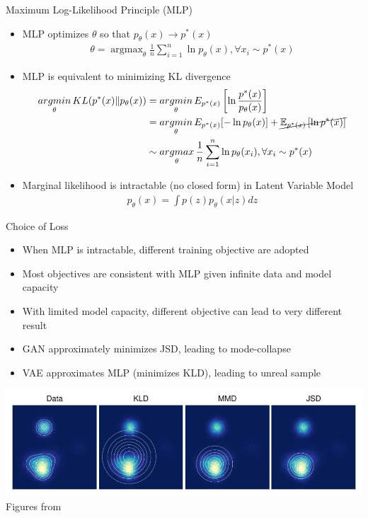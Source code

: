 \documentclass[compress]{beamer}
\newcommand{\expects}[2]{\mathbb{E}_{#1} \left[ #2 \right]}
\begin{document}
\begin{frame}{Maximum Log-Likelihood Principle (MLP)}
    \begin{itemize}
        \item MLP optimizes $\theta$ so that $p_{\theta}(x)\rightarrow p^*(x)$
            \begin{align*}
                \theta = \mathop{argmax}_{\theta} \frac{1}{n}\sum_{i=1}^n \ln p_{\theta}(x), \forall x_i \sim p^*(x)
            \end{align*}
        \item MLP is equivalent to minimizing KL divergence
            \begin{align*}
                \mathop{argmin}_{\theta} KL(p^*(x)\|p_{\theta}(x)) & = \mathop{argmin}_{\theta} E_{p^*(x)} \left[ \ln \frac{p^*(x)}{p_{\theta}(x)}  \right]
                 \\
                                                                   & = \mathop{argmin}_{\theta} E_{p^*(x)}[-\ln p_{\theta}(x)] + \cancel{\expects{p^*(x)}{\ln p^*(x)}}\\
                                                                   & \sim \mathop{argmax}_{\theta} \frac{1}{n}\sum_{i=1}^n \ln p_{\theta}(x_i), \forall x_i \sim p^*(x)
            \end{align*}
        \item Marginal likelihood is intractable (no closed form) in Latent Variable Model
            \begin{align*}
                p_{\theta}(x) = \int p(z)p_{\theta}(x|z) dz
            \end{align*}
    \end{itemize}
\end{frame}

\begin{frame}[t]{Choice of Loss}
    \begin{itemize}
        \item When MLP is intractable, different training objective are adopted
        \item Most objectives are consistent with MLP given infinite data and model capacity
        \item With limited model capacity, different objective can lead to very different result
        \item GAN approximately minimizes JSD, leading to mode-collapse
        \item VAE approximates MLP (minimizes KLD), leading to unreal sample
    \end{itemize}
    \includegraphics[height=0.4\textheight,width=\textwidth]{loss}
    \tiny{Figures from \cite{theis2015note}}
\end{frame}
\end{document}
